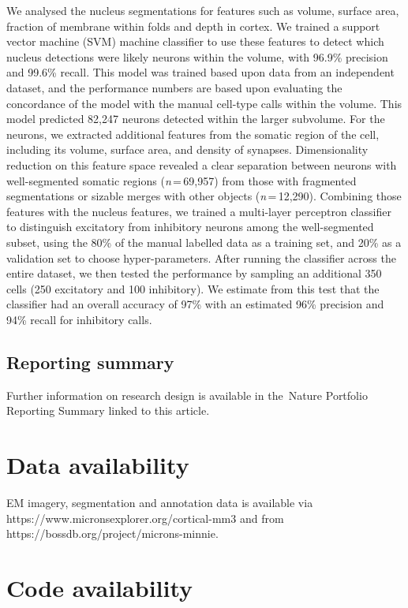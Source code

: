 \documentclass{article}
\begin{document}
We analysed the nucleus segmentations for features such as volume, surface area, fraction of membrane within folds and depth in cortex. We trained a support vector machine (SVM) machine classifier to use these features to detect which nucleus detections were likely neurons within the volume, with 96.9\% precision and 99.6\% recall. This model was trained based upon data from an independent dataset, and the performance numbers are based upon evaluating the concordance of the model with the manual cell-type calls within the volume. This model predicted 82,247 neurons detected within the larger subvolume. For the neurons, we extracted additional features from the somatic region of the cell, including its volume, surface area, and density of synapses. Dimensionality reduction on this feature space revealed a clear separation between neurons with well-segmented somatic regions (\emph{n}\,=\,69,957) from those with fragmented segmentations or sizable merges with other objects (\emph{n}\,=\,12,290). Combining those features with the nucleus features, we trained a multi-layer perceptron classifier to distinguish excitatory from inhibitory neurons among the well-segmented subset, using the 80\% of the manual labelled data as a training set, and 20\% as a validation set to choose hyper-parameters. After running the classifier across the entire dataset, we then tested the performance by sampling an additional 350 cells (250 excitatory and 100 inhibitory). We estimate from this test that the classifier had an overall accuracy of 97\% with an estimated 96\% precision and 94\% recall for inhibitory calls.

\subsection*{Reporting summary}

Further information on research design is available in the~Nature Portfolio Reporting Summary linked to this article.

\section*{Data availability}

EM imagery, segmentation and annotation data is available via https://www.micronsexplorer.org/cortical-mm3 and from https://bossdb.org/project/microns-minnie.

\section*{Code availability}
\end{document}
